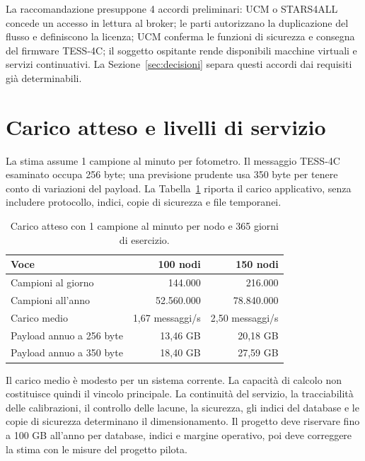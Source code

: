 \documentclass[11pt,a4paper]{report}
\begin{document}
La raccomandazione presuppone 4 accordi preliminari: UCM o STARS4ALL concede un accesso in lettura al broker; le parti autorizzano la duplicazione del flusso e definiscono la licenza; UCM conferma le funzioni di sicurezza e consegna del firmware TESS-4C; il soggetto ospitante rende disponibili macchine virtuali e servizi continuativi. La Sezione~\ref{sec:decisioni} separa questi accordi dai requisiti già determinabili.

\section*{Carico atteso e livelli di servizio}

La stima assume 1 campione al minuto per fotometro. Il messaggio TESS-4C esaminato occupa 256 byte; una previsione prudente usa 350 byte per tenere conto di variazioni del payload. La Tabella~\ref{tab:carico} riporta il carico applicativo, senza includere protocollo, indici, copie di sicurezza e file temporanei.

\begin{table}[ht!]
\centering
\renewcommand{\arraystretch}{1.5}
\small

\begin{tabularx}{\linewidth}{@{}X r r@{}}
\toprule
Voce & 100 nodi & 150 nodi \\
\midrule
Campioni al giorno & 144.000 & 216.000 \\
Campioni all'anno & 52.560.000 & 78.840.000 \\
Carico medio & 1,67 messaggi/s & 2,50 messaggi/s \\
Payload annuo a 256 byte & 13,46 GB & 20,18 GB \\
Payload annuo a 350 byte & 18,40 GB & 27,59 GB \\
\bottomrule
\end{tabularx}

\caption{Carico atteso con 1 campione al minuto per nodo e 365 giorni di esercizio.}
\label{tab:carico}
\end{table}

Il carico medio è modesto per un sistema corrente. La capacità di calcolo non costituisce quindi il vincolo principale. La continuità del servizio, la tracciabilità delle calibrazioni, il controllo delle lacune, la sicurezza, gli indici del database e le copie di sicurezza determinano il dimensionamento. Il progetto deve riservare fino a 100 GB all'anno per database, indici e margine operativo, poi deve correggere la stima con le misure del progetto pilota.
\end{document}
